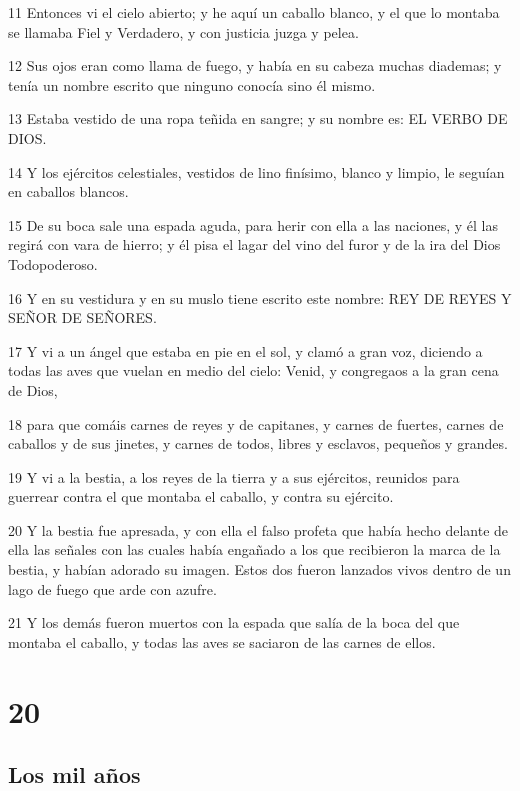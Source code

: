 \par 11 Entonces vi el cielo abierto; y he aquí un caballo blanco, y el que lo montaba se llamaba Fiel y Verdadero, y con justicia juzga y pelea.
\par 12 Sus ojos eran como llama de fuego, y había en su cabeza muchas diademas; y tenía un nombre escrito que ninguno conocía sino él mismo.
\par 13 Estaba vestido de una ropa teñida en sangre; y su nombre es: EL VERBO DE DIOS.
\par 14 Y los ejércitos celestiales, vestidos de lino finísimo, blanco y limpio, le seguían en caballos blancos.
\par 15 De su boca sale una espada aguda, para herir con ella a las naciones, y él las regirá con vara de hierro; y él pisa el lagar del vino del furor y de la ira del Dios Todopoderoso.
\par 16 Y en su vestidura y en su muslo tiene escrito este nombre: REY DE REYES Y SEÑOR DE SEÑORES.
\par 17 Y vi a un ángel que estaba en pie en el sol, y clamó a gran voz, diciendo a todas las aves que vuelan en medio del cielo: Venid, y congregaos a la gran cena de Dios,
\par 18 para que comáis carnes de reyes y de capitanes, y carnes de fuertes, carnes de caballos y de sus jinetes, y carnes de todos, libres y esclavos, pequeños y grandes.
\par 19 Y vi a la bestia, a los reyes de la tierra y a sus ejércitos, reunidos para guerrear contra el que montaba el caballo, y contra su ejército.
\par 20 Y la bestia fue apresada, y con ella el falso profeta que había hecho delante de ella las señales con las cuales había engañado a los que recibieron la marca de la bestia, y habían adorado su imagen. Estos dos fueron lanzados vivos dentro de un lago de fuego que arde con azufre.
\par 21 Y los demás fueron muertos con la espada que salía de la boca del que montaba el caballo, y todas las aves se saciaron de las carnes de ellos.

\chapter{20}

\section*{Los mil años}

